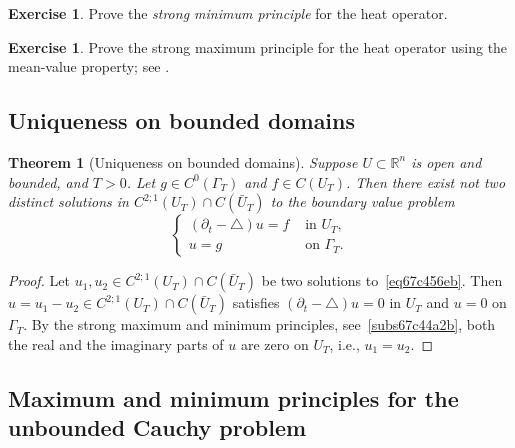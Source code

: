 \documentclass[a4paper,9pt]{amsart}
\newcommand{\R}{\mathbb{R}}	%
\newcommand{\de}{\partial}		%
\newcommand{\laplacian}{\triangle}
\theoremstyle{plain}
\newtheorem{theorem}[proposition]{Theorem}
\theoremstyle{definition}
\newtheorem{exercise}[proposition]{Exercise}%
\theoremstyle{remark}
\begin{document}
\begin{exercise}
	Prove the \emph{strong minimum principle} for the heat operator.
\end{exercise}

\begin{exercise}
	Prove the strong maximum principle for the heat operator using the mean-value property; see \cite{MR2597943}.
\end{exercise}

\subsection{Uniqueness on bounded domains}\label{subs67c4558e}
\begin{theorem}[Uniqueness on bounded domains]\label{thm67c455a4}
	Suppose $U\subset\R^n$ is open and bounded, and $T>0$.
	Let $g\in C^0(\Gamma_T)$ and $f\in C(U_T)$.
	Then there exist not two distinct solutions in $C^{2;1}(U_T)\cap C(\bar U_T)$ to the boundary value problem
	\begin{equation}\label{eq67c456eb}
	\begin{cases}
		(\de_t-\laplacian)u = f & \text{ in }U_T , \\
		u = g & \text{ on }\Gamma_T .
	\end{cases}
	\end{equation}
\end{theorem}
\begin{proof}
	Let $u_1,u_2\in C^{2;1}(U_T)\cap C(\bar U_T)$ be two solutions to~\eqref{eq67c456eb}.
	Then $u=u_1-u_2 \in C^{2;1}(U_T)\cap C(\bar U_T)$ satisfies $(\de_t-\laplacian)u =0$ in $U_T$ and $u = 0$ on $\Gamma_T$.
	By the strong maximum and minimum principles, see~\ref{subs67c44a2b}, both the real and the imaginary parts of $u$ are zero on $U_T$, i.e., $u_1=u_2$.
\end{proof}

\subsection{Maximum and minimum principles for the unbounded Cauchy problem}\label{subs67c45d73}
\end{document}
